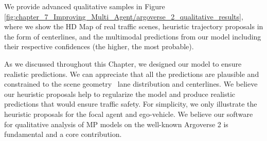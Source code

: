 We provide advanced qualitative samples in Figure \ref{fig:chapter_7_Improving_Multi_Agent/argoverse_2_qualitative_results}, where we show the HD Map of real traffic scenes, heuristic trajectory proposals in the form of centerlines, and the multimodal predictions from our model including their respective confidences (the higher, the most probable). 

As we discussed throughout this Chapter, we designed our model to ensure realistic predictions. We can appreciate that all the predictions are plausible and constrained to the scene geometry \eg \ lane distribution and centerlines. We believe our heuristic proposals help to regularize the model and produce realistic predictions that would ensure traffic safety. For simplicity, we only illustrate the heuristic proposals for the focal agent and ego-vehicle. We believe our software for qualitative analysis of MP models on the well-known Argoverse 2 \cite{wilson2023argoverse} is fundamental and a core contribution.


